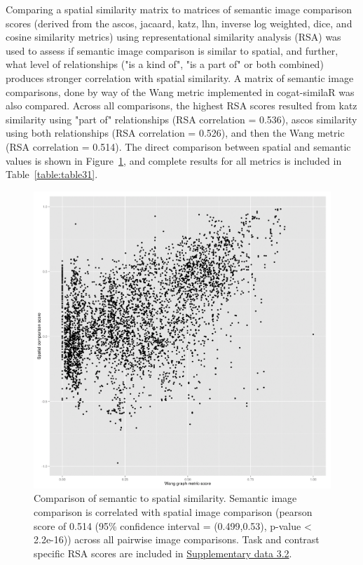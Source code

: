 \documentclass{report}
\begin{document}
Comparing a spatial similarity matrix to matrices of semantic image comparison scores (derived from the ascos, jacaard, katz, lhn, inverse log weighted, dice, and cosine similarity metrics) using representational similarity analysis (RSA) was used to assess if semantic image comparison is similar to spatial, and further, what level of relationships ("is a kind of", "is a part of" or both combined) produces stronger correlation with spatial similarity. A matrix of semantic image comparisons, done by way of the Wang metric implemented in cogat-similaR \cite{CognitiveAtlas_undated-hk} was also compared. Across all comparisons, the highest RSA scores resulted from katz similarity using "part of" relationships (RSA correlation = 0.536), ascos similarity using both relationships (RSA correlation = 0.526), and then the Wang metric (RSA correlation = 0.514). The direct comparison between spatial and semantic values is shown in Figure~\ref{fig:33}, and complete results for all metrics is included in Table~\ref{table:table31}.

\begin{figure}[ht!]
\begin{center}
\includegraphics[width=15cm]{images/figure33.png}
\end{center}
 \caption{\label{fig:33} Comparison of semantic to spatial similarity. Semantic image
comparison is correlated with spatial image comparison (pearson score of
0.514 (95\% confidence interval = (0.499,0.53), p-value \textless{}
2.2e-16)) across all pairwise image comparisons. Task and contrast
specific RSA scores are included in \href{https://github.com/vsoch/thesis/blob/master/supplementary/chapter3/supp1_spatial_semantic_rsa_df.csv}{Supplementary data 3.2}.}
\end{figure}
\end{document}
